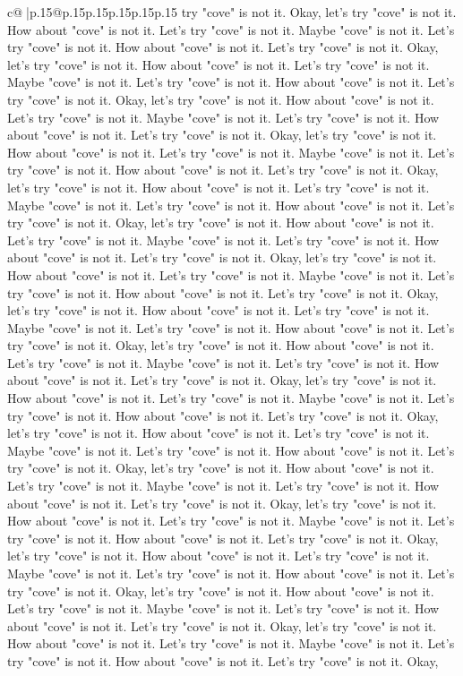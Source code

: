 \documentclass{article}
\begin{document}
{\begin{supertabular}{c@{$\;$}|p{.15\linewidth}@{}p{.15\linewidth}p{.15\linewidth}p{.15\linewidth}p{.15\linewidth}p{.15\linewidth}}
{{{try "cove" is not it. Okay, let's try "cove" is not it. How about "cove" is not it. Let's try "cove" is not it. Maybe "cove" is not it. Let's try "cove" is not it. How about "cove" is not it. Let's try "cove" is not it. Okay, let's try "cove" is not it. How about "cove" is not it. Let's try "cove" is not it. Maybe "cove" is not it. Let's try "cove" is not it. How about "cove" is not it. Let's try "cove" is not it. Okay, let's try "cove" is not it. How about "cove" is not it. Let's try "cove" is not it. Maybe "cove" is not it. Let's try "cove" is not it. How about "cove" is not it. Let's try "cove" is not it. Okay, let's try "cove" is not it. How about "cove" is not it. Let's try "cove" is not it. Maybe "cove" is not it. Let's try "cove" is not it. How about "cove" is not it. Let's try "cove" is not it. Okay, let's try "cove" is not it. How about "cove" is not it. Let's try "cove" is not it. Maybe "cove" is not it. Let's try "cove" is not it. How about "cove" is not it. Let's try "cove" is not it. Okay, let's try "cove" is not it. How about "cove" is not it. Let's try "cove" is not it. Maybe "cove" is not it. Let's try "cove" is not it. How about "cove" is not it. Let's try "cove" is not it. Okay, let's try "cove" is not it. How about "cove" is not it. Let's try "cove" is not it. Maybe "cove" is not it. Let's try "cove" is not it. How about "cove" is not it. Let's try "cove" is not it. Okay, let's try "cove" is not it. How about "cove" is not it. Let's try "cove" is not it. Maybe "cove" is not it. Let's try "cove" is not it. How about "cove" is not it. Let's try "cove" is not it. Okay, let's try "cove" is not it. How about "cove" is not it. Let's try "cove" is not it. Maybe "cove" is not it. Let's try "cove" is not it. How about "cove" is not it. Let's try "cove" is not it. Okay, let's try "cove" is not it. How about "cove" is not it. Let's try "cove" is not it. Maybe "cove" is not it. Let's try "cove" is not it. How about "cove" is not it. Let's try "cove" is not it. Okay, let's try "cove" is not it. How about "cove" is not it. Let's try "cove" is not it. Maybe "cove" is not it. Let's try "cove" is not it. How about "cove" is not it. Let's try "cove" is not it. Okay, let's try "cove" is not it. How about "cove" is not it. Let's try "cove" is not it. Maybe "cove" is not it. Let's try "cove" is not it. How about "cove" is not it. Let's try "cove" is not it. Okay, let's try "cove" is not it. How about "cove" is not it. Let's try "cove" is not it. Maybe "cove" is not it. Let's try "cove" is not it. How about "cove" is not it. Let's try "cove" is not it. Okay, let's try "cove" is not it. How about "cove" is not it. Let's try "cove" is not it. Maybe "cove" is not it. Let's try "cove" is not it. How about "cove" is not it. Let's try "cove" is not it. Okay, let's try "cove" is not it. How about "cove" is not it. Let's try "cove" is not it. Maybe "cove" is not it. Let's try "cove" is not it. How about "cove" is not it. Let's try "cove" is not it. Okay, let's try "cove" is not it. How about "cove" is not it. Let's try "cove" is not it. Maybe "cove" is not it. Let's try "cove" is not it. How about "cove" is not it. Let's try "cove" is not it. Okay, }}}
\end{supertabular}}
\end{document}
